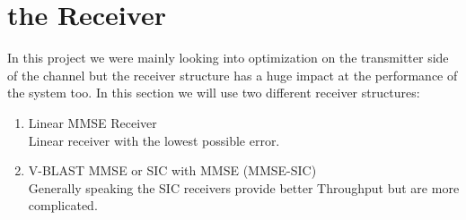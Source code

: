 \section{the Receiver}
In this project we were mainly looking into optimization on the transmitter side of the channel but the receiver structure has a huge impact at the performance of the system too.
In this section we will use two different receiver structures:
\begin{enumerate}
	\item Linear MMSE Receiver\\
	Linear receiver with the lowest possible error.
	\item V-BLAST MMSE or SIC with MMSE (MMSE-SIC)\\
	Generally speaking the SIC receivers provide better Throughput but are more complicated.
\end{enumerate}

